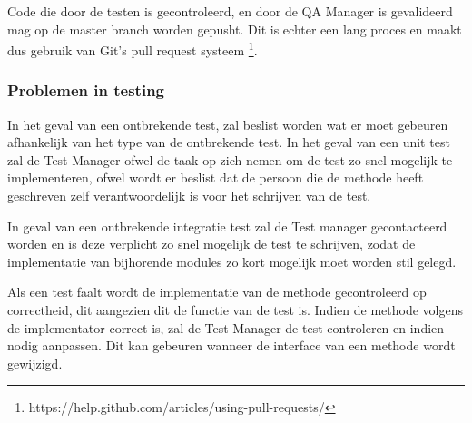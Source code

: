 \documentclass[a4paper]{article}
\begin{document}
Code die door de testen is gecontroleerd, en door de QA Manager is gevalideerd mag op de master branch worden gepusht. Dit is echter een lang proces en maakt dus gebruik van Git's pull request systeem \footnote{https://help.github.com/articles/using-pull-requests/}. \newline

\subsubsection {Problemen in testing}

In het geval van een ontbrekende test, zal beslist worden wat er moet gebeuren afhankelijk van het type van de ontbrekende test. In het geval van een unit test zal de Test Manager ofwel de taak op zich nemen om de test zo snel mogelijk te implementeren, ofwel wordt er beslist dat de persoon die de methode heeft geschreven zelf verantwoordelijk is voor het schrijven van de test.\newline

In geval van een ontbrekende integratie test zal de Test manager gecontacteerd worden en is deze verplicht zo snel mogelijk de test te schrijven, zodat de implementatie van bijhorende modules zo kort mogelijk moet worden stil gelegd.\newline

Als een test faalt wordt de implementatie van de methode gecontroleerd op correctheid, dit aangezien dit de functie van de test is. Indien de methode volgens de implementator correct is, zal de Test Manager de test controleren en indien nodig aanpassen. Dit kan gebeuren wanneer de interface van een methode wordt gewijzigd.
\end{document}
